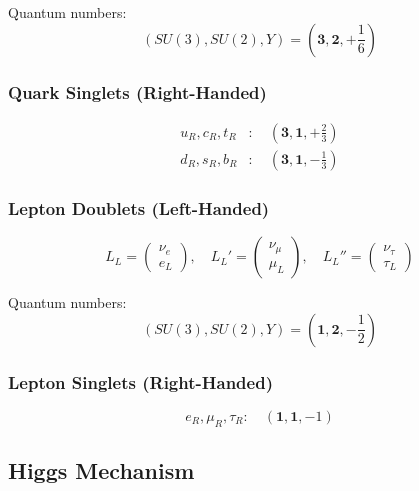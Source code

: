 Quantum numbers:
\begin{equation}
(SU(3), SU(2), Y) = (\mathbf{3}, \mathbf{2}, +\frac{1}{6})
\end{equation}

\subsubsection{Quark Singlets (Right-Handed)}

\begin{align}
u_R, c_R, t_R &: \quad (\mathbf{3}, \mathbf{1}, +\frac{2}{3}) \\
d_R, s_R, b_R &: \quad (\mathbf{3}, \mathbf{1}, -\frac{1}{3})
\end{align}

\subsubsection{Lepton Doublets (Left-Handed)}

\begin{equation}
L_L = \begin{pmatrix} \nu_e \\ e_L \end{pmatrix}, \quad
L_L' = \begin{pmatrix} \nu_\mu \\ \mu_L \end{pmatrix}, \quad
L_L'' = \begin{pmatrix} \nu_\tau \\ \tau_L \end{pmatrix}
\end{equation}

Quantum numbers:
\begin{equation}
(SU(3), SU(2), Y) = (\mathbf{1}, \mathbf{2}, -\frac{1}{2})
\end{equation}

\subsubsection{Lepton Singlets (Right-Handed)}

\begin{equation}
e_R, \mu_R, \tau_R : \quad (\mathbf{1}, \mathbf{1}, -1)
\end{equation}

\subsection{Higgs Mechanism}

